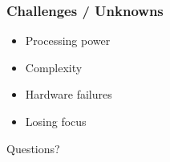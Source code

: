 \documentclass{beamer}
\begin{document}
\begin{frame}
    \frametitle{Challenges / Unknowns}
    \begin{itemize}
        \item Processing power
        \item Complexity
        \item Hardware failures
        \item Losing focus 
    \end{itemize}
\end{frame}

\begin{frame}
    \begin{center}
        \Huge Questions?
    \end{center}
\end{frame}
\end{document}
